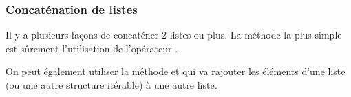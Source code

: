 \documentclass[letterpaper,10pt,english]{sphinxmanual}
\begin{document}
\subsubsection{Concaténation de listes}
\label{\detokenize{src/OCI02_Listes:concatenation-de-listes}}
Il y a plusieurs façons de concaténer 2 listes ou plus. La méthode la plus simple est sûrement l’utilisation de l’opérateur \sphinxcode{\sphinxupquote{+}}.

\begin{sphinxVerbatim}[commandchars=\\\{\}]
  \PYG{p}{[}   \PYG{p}{]}
  \PYG{p}{[}  \PYG{p}{]}

    
\end{sphinxVerbatim}

On peut également utiliser la méthode  et qui va rajouter les éléments d’une liste (ou une autre structure itérable) à une autre liste.

\begin{sphinxVerbatim}[commandchars=\\\{\}]
  \PYG{p}{[}   \PYG{p}{]}
  \PYG{p}{[}  \PYG{p}{]}

\end{sphinxVerbatim}
\end{document}
